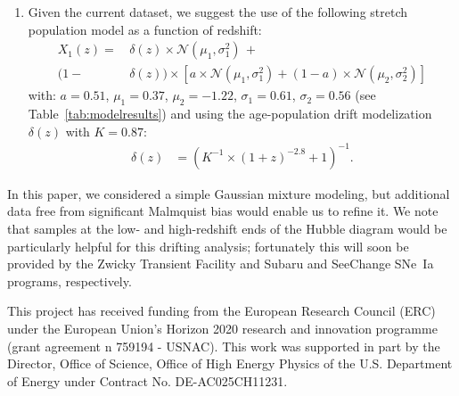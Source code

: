 \documentclass[]{aa} %
\begin{document}
\begin{enumerate}
    \item Given the current dataset, we suggest the use of the following stretch
        population model as a function of redshift:
        \begin{align}\label{eqconclusion:stretchz}
            X_1\left(z \right) =
             &\,\delta(z)\times\mathcal{N}(\mu_1,\sigma_1^2)\,+\nonumber\\
            (1-&\,\delta(z)) \times  \left[a\times\mathcal{N}(\mu_1,\sigma_1^2) +
            (1-a)\times\mathcal{N}(\mu_2,\sigma_2^2)\right]
        \end{align}
        with: $a=0.51$, $\mu_1=0.37$, $\mu_2=-1.22$, $\sigma_1=0.61$,
        $\sigma_2=0.56$ (see Table~\ref{tab:modelresults}) and using the
        age-population drift modelization $\delta(z)$ with $K=0.87$:
        \begin{align}
            \delta(z) & = \left( K^{-1} \times (1+z)^{-2.8} +1 \right)^{-1}.
        \end{align}
\end{enumerate}

In this paper, we considered a simple Gaussian mixture modeling, but additional
data free from significant Malmquist bias would enable us to refine it. We note
that samples at the low- and high-redshift ends of the Hubble diagram would be
particularly helpful for this drifting analysis; fortunately this will soon be
provided by the Zwicky Transient Facility \citep{bellm2019, graham2019} and
Subaru and SeeChange SNe~Ia programs, respectively.

\begin{acknowledgements}
    This project has received funding from the European Research Council (ERC)
    under the European Union's Horizon 2020 research and innovation programme
    (grant agreement n 759194 - USNAC).
    This work was supported in part by the Director, Office of Science, Office
    of High Energy Physics of the U.S.  Department of Energy under Contract No.
    DE-AC025CH11231.
\end{acknowledgements}
\end{document}
